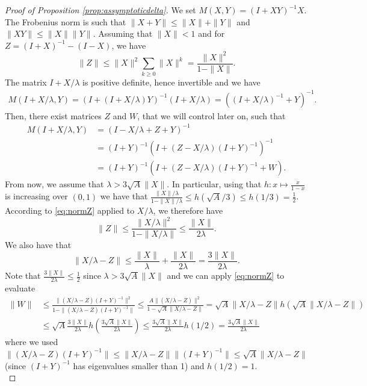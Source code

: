 \documentclass{article}
\begin{document}
\begin{proof}[Proof of Proposition \ref{prop:assymptoticdelta}]
We set $M(X,Y) = (I + XY)^{-1}X$.
The Frobenius norm is such that $\| X + Y \| \leq \| X \| + \| Y\|$ and $\| X  Y \| \leq \| X \| \| Y\|$.
Assuming that $\|X\| < 1$ and for $Z = (I + X)^{-1} - (I - X)$, we have 
\begin{equation} \label{eq:normZ}
    \| Z \| \leq \| X \|^
2 \sum_{k\geq 0} \| X \|^k = \frac{\| X \|^2}{1 - \| X \|}.
\end{equation} 
The matrix $I + X / \lambda$ is positive definite, hence invertible and we have
\begin{align}
    M(I + X /\lambda,Y) = (I + (I+X/\lambda)Y)^{-1} (I+X/\lambda) = ( (I+X/\lambda)^{-1} + Y)^{-1}.
\end{align}
Then, there exist matrices $Z$ and $W$, that we will control later on, such that
\begin{align} \label{eq:MXdelta}
    M(I + X /\lambda,Y) &=  ( I - X/\lambda+ Z + Y)^{-1} \\
    &= (I + Y)^{-1} (I + (Z - X / \lambda) (I +Y)^{-1})^{-1} \\
    &= (I + Y)^{-1} (I + (Z - X / \lambda) (I +Y)^{-1} + W).
\end{align}
From now, we assume that $\lambda > 3\sqrt{A}\|X\|$. In particular, using that $h : x \mapsto \frac{x}{1 - x}$ is increasing over $(0,1)$ we have that $ \frac{  \| X \| / \lambda}{1 -   \| X \| / \lambda } \leq h(\sqrt{A}/3) \leq h(1/3) = \frac12$.
According to \eqref{eq:normZ} applied to $X/\lambda$, we therefore have 
\begin{equation} %
    \| Z \| \leq   \frac{\| X / \lambda \|^2}{1 - \| X / \lambda \|} \leq \frac{\| X\|}{2 \lambda}.
\end{equation} 
We also have that
\begin{equation} %
    \| X / \lambda - Z \| \leq \frac{\| X\|}{ \lambda} + \frac{\| X\|}{2 \lambda} = \frac{3 \| X\|}{2 \lambda}.
\end{equation} 
Note that $\frac{3 \| X\|}{2 \lambda} \leq \frac12$ since $\lambda > 3 \sqrt{A} \|X\|$ and we can apply \eqref{eq:normZ} to evaluate
\begin{align} \label{eq:normW}
    \| W  \| &\leq \frac{\| (X/\lambda - Z) (I + Y)^{-1}\|^2}{1 - \| (X/\lambda - Z)  (I + Y)^{-1}\| } 
    \leq \frac{ A \|  (X/\lambda - Z)\|^2}{1 - \sqrt{A}\| X/\lambda - Z\|} = 
    \sqrt{A} \| X/\lambda - Z \| h(\sqrt{A}\| X/\lambda - Z\|) \\
    &\leq \sqrt{A} \frac{3 \| X\|}{2 \lambda} h\left( \frac{3 \sqrt{A}\| X\|}{2 \lambda}\right) \leq
     \frac{3\sqrt{A}  \| X\|}{2 \lambda} h\left( 1/2 \right)  = \frac{3\sqrt{A}  \| X\|}{2 \lambda}
\end{align} 
where we used $\| (X/\lambda - Z) (I + Y)^{-1}\| \leq \| X/\lambda - Z \| \|(I + Y)^{-1}\| \leq \sqrt{A} \| X/\lambda - Z \|$ (since $(I + Y)^{-1}$ has eigenvalues smaller than 1) and $h(1/2) = 1$. \\


\end{proof}
\end{document}
